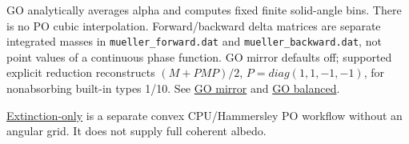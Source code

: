 GO analytically averages alpha and computes fixed finite solid-angle
bins. There is no PO cubic interpolation. Forward/backward delta
matrices are separate integrated masses in \nolinkurl{mueller_forward.dat}
and \nolinkurl{mueller_backward.dat}, not point values of a continuous
phase function. GO mirror defaults off; supported explicit reduction
reconstructs \((M+PMP)/2\), \(P=diag(1,1,-1,-1)\), for nonabsorbing
built-in types 1/10. See \href{GO_MIRROR.md}{GO mirror} and
\href{GO_BALANCED.md}{GO balanced}.

\href{EXTINCTION_ONLY.md}{Extinction-only} is a separate convex
CPU/Hammersley PO workflow without an angular grid. It does not supply
full coherent albedo.
